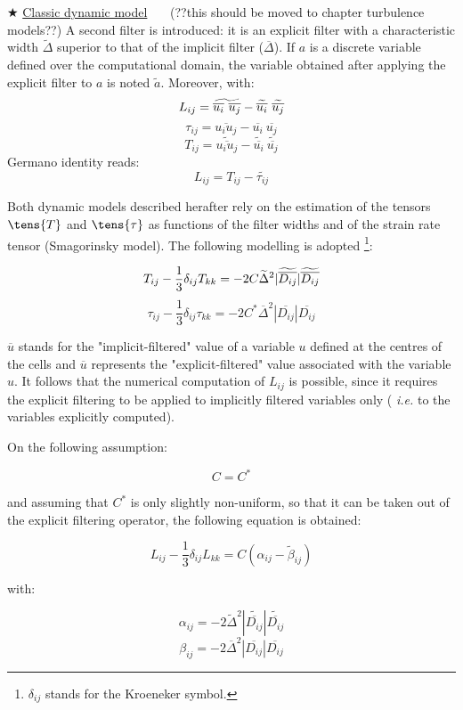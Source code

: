 {\tiny $\bigstar $} \underline{Classic dynamic model} \ \ \ (??this should
be moved to chapter turbulence models??) \newline
\newline
A second filter is introduced: it is an explicit filter with a
characteristic width $\widetilde{\Delta }$ superior to that of the implicit
filter ($\overline{\Delta }$). If $a$ is a discrete variable defined over
the computational domain, the variable obtained after applying the explicit
filter to $a$ is noted $\tilde{a}$. Moreover, with:
\[
L_{ij}=\widetilde{\overline{u_{i}}\ \overline{u_{j}}}-\widetilde{\overline{%
u_{i}}}\ \widetilde{\overline{u_{j}}}
\]%
\[
\tau _{ij}=\overline{u_{i}u_{j}}-\overline{u_{i}}\ \overline{u_{j}}
\]%
\[
T_{ij}=\widetilde{\overline{u_{i}u_{j}}}-\widetilde{\overline{u_{i}}}\
\widetilde{\overline{u_{j}}}
\]%
Germano identity reads:
\[
L_{ij}=T_{ij}-\widetilde{\tau _{ij}}
\]

Both dynamic models described herafter rely on the estimation of the tensors
$\tens{T}$ and $\tens{\tau}$ as functions of the filter widths and of the
strain rate tensor (Smagorinsky model). The following modelling is adopted%
\footnote{$\delta_{ij}$ stands for the Kroeneker symbol.}:

\[
T_{ij}-\frac{1}{3}\delta_{ij} T_{kk}= -2 C \widetilde{\Delta}^2 |\widetilde{%
\overline{D_{ij}}}| \widetilde{\overline{D_{ij}}}
\]
\[
\tau_{ij}-\frac{1}{3}\delta_{ij} \tau_{kk}= -2 C^* \overline{\Delta}^2 |%
\overline{D_{ij}}| \overline{D_{ij}}
\]

$\overline{u}$ stands for the "implicit-filtered" value of a variable $u$
defined at the centres of the cells and $\overline{u}$ represents the
"explicit-filtered" value associated with the variable $u$. It follows that
the numerical computation of $L_{ij}$ is possible, since it requires the
explicit filtering to be applied to implicitly filtered variables only (%
\textit{i.e.} to the variables explicitly computed).

On the following assumption:

\[
C = C^*
\]

and assuming that $C^*$ is only slightly non-uniform, so that it can be
taken out of the explicit filtering operator, the following equation is
obtained:

\[
L_{ij} -\frac{1}{3} \delta_{ij} L_{kk}= C (\alpha_{ij}-\widetilde{\beta}%
_{ij})
\]

with:

\[
\alpha_{ij} = -2 \widetilde{\Delta}^2 |\widetilde{\overline{D_{ij}}}|
\widetilde{\overline{D_{ij}}}
\]
\[
\beta_{ij} = -2 \overline{\Delta}^2 |\overline{D_{ij}}| \overline{D_{ij}}
\]

